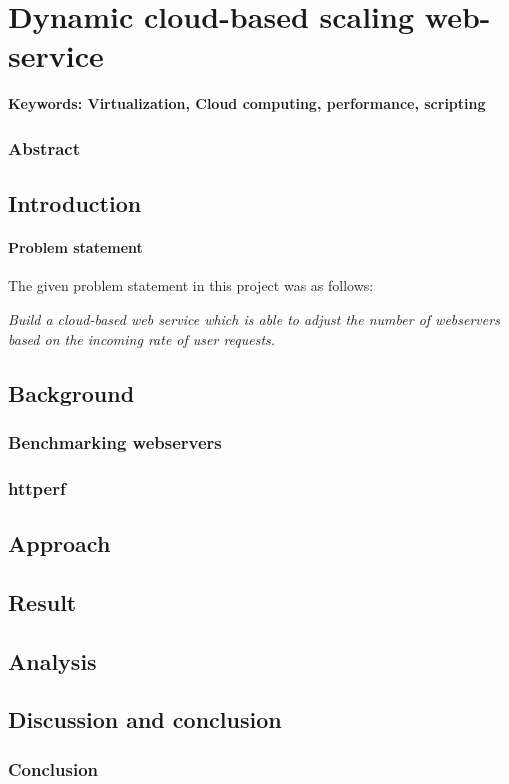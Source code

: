\chapter{Dynamic cloud-based scaling web-service}

\textbf{Keywords: Virtualization, Cloud computing, performance, scripting} 

\subsection*{Abstract}


\section{Introduction}

\subsubsection{Problem statement}

The given problem statement in this project was as follows:

\emph{Build a cloud-based web service which is able to adjust the number of
webservers based on the incoming rate of user requests.}

\section{Background}

\subsection{Benchmarking webservers}

\subsection{httperf}


\section*{Approach}

\section{Result}


\section{Analysis}

\section{Discussion and conclusion}

\subsection{Conclusion}
